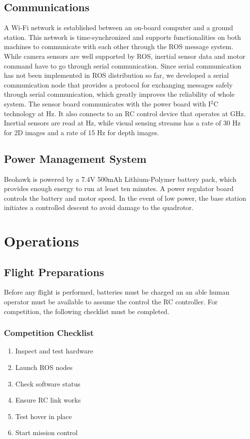 \documentclass[12pt, letterpaper]{article}
\begin{document}
\subsection{Communications}

A Wi-Fi network is established between an on-board computer and a ground station. This network is time-synchronized and supports functionalities on both machines to communicate with each other through the ROS message system. While camera sensors are well supported by ROS, inertial sensor data and motor command have to go through serial communication. Since serial communication has not been implemented in ROS distribution so far, we developed a serial communication node that provides a protocol for exchanging messages safely through serial communication, which greatly improves the reliability of whole system. The sensor board communicates with the power board with I$^2$C technology at  Hz. It also connects to an RC control device that operates at  GHz. Inertial sensors are read at  Hz, while visual sensing streams has a rate of 30 Hz for 2D images and a rate of 15 Hz for depth images.

\subsection{Power Management System}
Beohawk is powered by a 7.4V 500mAh Lithium-Polymer battery pack, which provides enough energy to run at least ten minutes. A power regulator board controls the battery and motor speed.  In the event of low power, the base station initiates a controlled descent to avoid damage to the quadrotor. 

\section{Operations}

\subsection{Flight Preparations}
Before any flight is performed, batteries must be charged an an able human operator must be available to assume the control the RC controller.  For competition, the following checklist must be completed.

\subsubsection{Competition Checklist}
\begin{enumerate}
  \item Inspect and test hardware
  \item Launch ROS nodes
  \item Check software status
  \item Ensure RC link works
  \item Test hover in place
  \item Start mission control
\end{enumerate}
\end{document}
